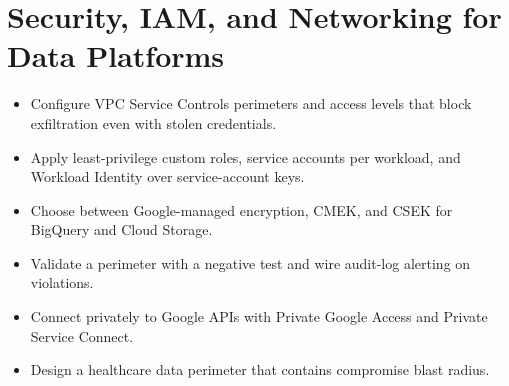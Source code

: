 \chapter{Security, IAM, and Networking for Data Platforms}

\begin{objectives}
\begin{itemize}
    \item Configure VPC Service Controls perimeters and access levels that block exfiltration even with stolen credentials.
    \item Apply least-privilege custom roles, service accounts per workload, and Workload Identity over service-account keys.
    \item Choose between Google-managed encryption, CMEK, and CSEK for BigQuery and Cloud Storage.
    \item Validate a perimeter with a negative test and wire audit-log alerting on violations.
    \item Connect privately to Google APIs with Private Google Access and Private Service Connect.
    \item Design a healthcare data perimeter that contains compromise blast radius.
\end{itemize}
\end{objectives}

